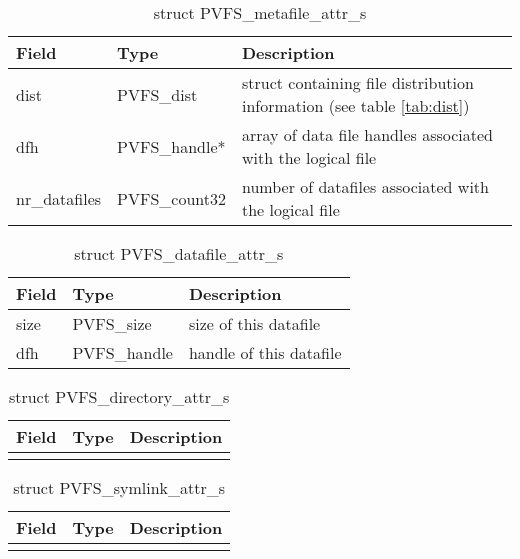 \documentclass[11pt, letterpaper]{article} %
\begin{document}
\begin{table}[H]
\begin{tabular}{|l|l|l|}
\hline
Field & Type & Description \\
\hline
\hline
dist & PVFS\_dist & struct containing file distribution information (see
table \ref{tab:dist})\\
\hline
dfh & PVFS\_handle* & array of data file handles associated with
the logical file\\
\hline
nr\_datafiles & PVFS\_count32 & number of datafiles associated
with the logical file\\
\hline
\end{tabular}
\caption{struct PVFS\_metafile\_attr\_s \label{tab:meta}}
\end{table}

\begin{table}[H]
\begin{tabular}{|l|l|l|}
\hline
Field & Type & Description \\
\hline
\hline
size & PVFS\_size & size of this datafile\\
\hline
dfh & PVFS\_handle & handle of this datafile\\
\hline
\end{tabular}
\caption{struct PVFS\_datafile\_attr\_s \label{tab:data}}
\end{table}

\begin{table}[H]
\begin{tabular}{|l|l|l|}
\hline
Field & Type & Description \\
\hline
\hline
[ EMPTY ] & & \\
\hline
\end{tabular}
\caption{struct PVFS\_directory\_attr\_s \label{tab:dir}}
\end{table}

\begin{table}[H]
\begin{tabular}{|l|l|l|}
\hline
Field & Type & Description \\
\hline
\hline
[ EMPTY ] & & \\
\hline
\end{tabular}
\caption{struct PVFS\_symlink\_attr\_s \label{tab:sym}}
\end{table}
\end{document}
